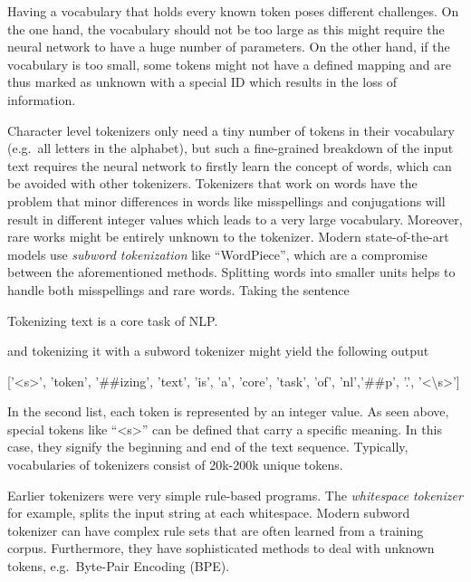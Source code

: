 Having a vocabulary that holds every known token poses different challenges.
On the one hand, the vocabulary should not be too large as this might require the neural network to have a huge number of parameters.
On the other hand, if the vocabulary is too small, some tokens might not have a defined mapping and are thus marked as unknown with a special ID which results in the loss of information.

Character level tokenizers only need a tiny number of tokens in their vocabulary (e.g.\ all letters in the alphabet), but such a fine-grained breakdown of the input text requires the neural network to firstly learn the concept of words, which can be avoided with other tokenizers.
Tokenizers that work on words have the problem that minor differences in words like misspellings and conjugations will result in different integer values which leads to a very large vocabulary.
Moreover, rare works might be entirely unknown to the tokenizer.
Modern state-of-the-art models use \textit{subword tokenization} like \enquote{WordPiece}, which are a compromise between the aforementioned methods.
Splitting words into smaller units helps to handle both misspellings and rare words.
Taking the sentence
\begin{center}
\colorbox{goodgreen!15}{
    \begin{minipage}{0.5\textwidth}
        Tokenizing text is a core task of NLP.
    \end{minipage}
}
\end{center}
and tokenizing it with a subword tokenizer might yield the following output
\begin{center}
\colorbox{goodgreen!15}{
    \centering
    \begin{minipage}{\textwidth}
    ['<s>', 'token', '\#\#izing', 'text', 'is', 'a', 'core', 'task', 'of', 'nl','\#\#p', '.', '<\backslash s>'] \newline
    [101, 19204, 6026, 3793, 2003, 1037, 4563, 4708, 1997, 17953, 2361, 1012, 102]
    \end{minipage}
}
\end{center}
In the second list, each token is represented by an integer value.
As seen above, special tokens like \enquote{<s>} can be defined that carry a specific meaning.
In this case, they signify the beginning and end of the text sequence.
Typically, vocabularies of tokenizers consist of 20k-200k unique tokens.

Earlier tokenizers were very simple rule-based programs.
The \textit{whitespace tokenizer} for example, splits the input string at each whitespace.
Modern subword tokenizer can have complex rule sets that are often learned from a training corpus.
Furthermore, they have sophisticated methods to deal with unknown tokens, e.g.\ Byte-Pair Encoding (BPE).

